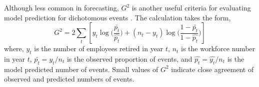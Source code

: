 \documentclass[12pt,letterpaper]{article}
\begin{document}

Although less common in forecasting, $G^2$ is another useful criteria for evaluating model prediction for dichotomous events \citep{Simonoff2002}. The calculation takes the form,
\begin{equation}
\label{eq:g2}
G^2=2\sum_{t}[y_t\log{(\frac{\bar{p_t}}{\hat{p_t}}})+ (n_t-y_t)\log{(\frac{1-\bar{p_t}}{1-\hat{p_t}}})]
\end{equation}
where, $y_t$ is the number of employees retired in year $t$, $n_t$ is the workforce number in year $t$, $\bar{p_t}={y_t}/{n_t}$ is the observed proportion of events, and $\hat{p_t}={\hat{y_t}}/{n_t} $ is the model predicted number of events.  Small values of $G^2$ indicate close agreement of observed and predicted numbers of events.




%
\end{document}
